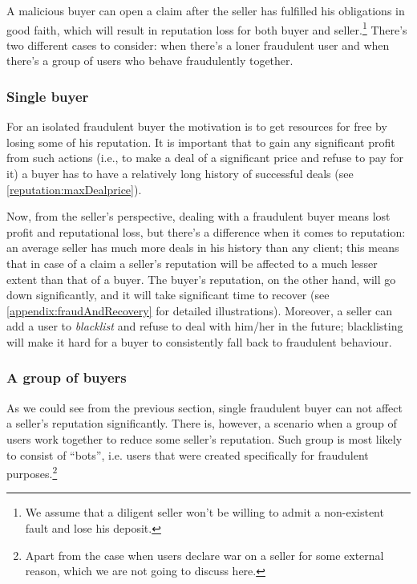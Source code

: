 \documentclass[11pt]{article}
\begin{document}
A malicious buyer can open a claim after the seller has fulfilled his obligations in good faith, which will result in reputation loss for both buyer and seller.\footnote{We assume that a diligent seller won't be willing to admit a non-existent fault and lose his deposit.} There's two different cases to consider: when there's a loner fraudulent user and when there's a group of users who behave fraudulently together.

\subsubsection{Single buyer} \label{threatModel:buyers:single}

For an isolated fraudulent buyer the motivation is to get resources for free by losing some of his reputation. It is important that to gain any significant profit from such actions (i.e., to make a deal of a significant price and refuse to pay for it) a buyer has to have a relatively long history of successful deals (see \ref{reputation:maxDealprice}).


Now, from the seller's perspective, dealing with a fraudulent buyer means lost profit and reputational loss, but there's a difference when it comes to reputation: an average seller has much more deals in his history than any client; this means that in case of a claim a seller's reputation will be affected to a much lesser extent than that of a buyer. The buyer's reputation, on the other hand, will go down significantly, and it will take significant time to recover (see \ref{appendix:fraudAndRecovery} for detailed illustrations). Moreover, a seller can add a user to \textit{blacklist} and refuse to deal with him/her in the future; blacklisting will make it hard for a buyer to consistently fall back to fraudulent behaviour. 

\subsubsection{A group of buyers} \label{threatModel:buyers:group}

As we could see from the previous section, single fraudulent buyer can not affect a seller's reputation significantly. There is, however, a scenario when a group of users work together to reduce some seller's reputation. Such group is most likely to consist of ``bots'', i.e. users that were created specifically for fraudulent purposes.\footnote{Apart from the case when users declare war on a seller for some external reason, which we are not going to discuss here.}
\end{document}
